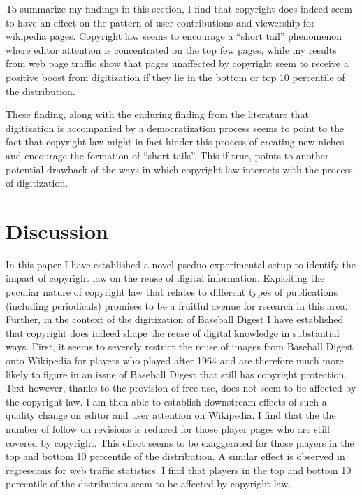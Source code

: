 \documentclass[12pt]{article}
\begin{document}
To summarize my findings in this section, I find that copyright does indeed seem to have an effect on the pattern of user contributions and viewership for wikipedia pages. Copyright law seems to encourage a ``short tail'' phenomenon where editor attention is concentrated on the top few pages, while my results from web page traffic show that pages unaffected by copyright seem to receive a positive boost from digitization if they lie in the bottom or top 10 percentile of the distribution. 

These finding, along with the enduring finding from the literature that digitization is accompanied by a democratization process seems to point to the fact that copyright law might in fact hinder this process of creating new niches and encourage the formation of ``short tails''. This if true, points to another potential drawback of the ways in which copyright law interacts with the process of digitization.

\section{Discussion}

In this paper I have established a novel pseduo-experimental setup to identify the impact of copyright law on the reuse of digital information. Exploiting the peculiar nature of copyright law that relates to different types of publications (including periodicals) promises to be a fruitful avenue for research in this area. Further, in the context of the digitization of Baseball Digest I have established that copyright does indeed shape the reuse of digital knowledge in substantial ways. First, it seems to severely restrict the reuse of images from Baseball Digest onto Wikipedia for players who played after 1964 and are therefore much more likely to figure in an issue of Baseball Digest that still has copyright protection. Text however, thanks to the provision of free use, does not seem to be affected by the copyright law. I am then able to establish downstream effects of such a quality change on editor and user attention on Wikipedia. I find that the the number of follow on revisions is reduced for those player pages who are still covered by copyright. This effect seems to be exaggerated for those players in the top and bottom 10 percentile of the distribution. A similar effect is observed in regressions for web traffic statistics. I find that players in the top and bottom 10 percentile of the distribution seem to be affected by copyright law. 
\end{document}
